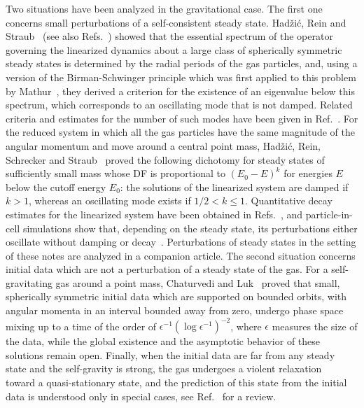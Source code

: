 Two situations have been analyzed in the gravitational case. The first one concerns small perturbations of a self-consistent steady state. Had\v{z}i\'c, Rein and Straub~\cite{mHgRcS22} (see also Refs.~\cite{Kunze-Book,mK22}) showed that the essential spectrum of the operator governing the linearized dynamics about a large class of spherically symmetric steady states is determined by the radial periods of the gas particles, and, using a version of the Birman-Schwinger principle which was first applied to this problem by Mathur~\cite{sM90}, they derived a criterion for the existence of an eigenvalue below this spectrum, which corresponds to an oscillating mode that is not damped. Related criteria and estimates for the number of such modes have been given in Ref.~\cite{mMpRhV26}. For the reduced system in which all the gas particles have the same magnitude of the angular momentum and move around a central point mass, Had\v{z}i\'c, Rein, Schrecker and Straub~\cite{mHgRmScS25} proved the following dichotomy for steady states of sufficiently small mass whose DF is proportional to $(E_0 - E)^k$ for energies $E$ below the cutoff energy $E_0$: the solutions of the linearized system are damped if $k > 1$, whereas an oscillating mode exists if $1/2 < k\leq 1$. Quantitative decay estimates for the linearized system have been obtained in Refs.~\cite{mHgRmScS24,mHmS25}, and particle-in-cell simulations show that, depending on the steady state, its perturbations either oscillate without damping or decay~\cite{tRgR18,cS24}. Perturbations of steady states in the setting of these notes are analyzed in a companion article. The second situation concerns initial data which are not a perturbation of a steady state of the gas. For a self-gravitating gas around a point mass, Chaturvedi and Luk~\cite{sCjL26} proved that small, spherically symmetric initial data which are supported on bounded orbits, with angular momenta in an interval bounded away from zero, undergo phase space mixing up to a time of the order of $\epsilon^{-1}(\log\epsilon^{-1})^{-2}$, where $\epsilon$ measures the size of the data, while the global existence and the asymptotic behavior of these solutions remain open. Finally, when the initial data are far from any steady state and the self-gravity is strong, the gas undergoes a violent relaxation~\cite{dL67} toward a quasi-stationary state, and the prediction of this state from the initial data is understood only in special cases, see Ref.~\cite{yLrPfRtTfB14} for a review.

